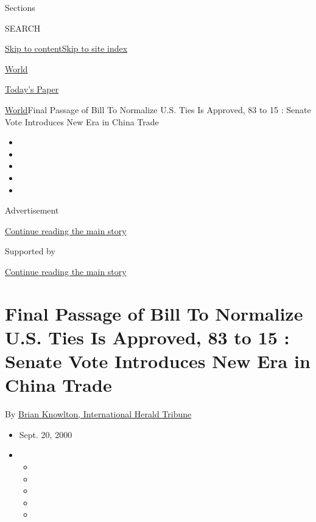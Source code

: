 Sections

SEARCH

\protect\hyperlink{site-content}{Skip to
content}\protect\hyperlink{site-index}{Skip to site index}

\href{https://www.nytimes3xbfgragh.onion/section/world}{World}

\href{https://myaccount.nytimes3xbfgragh.onion/auth/login?response_type=cookie\&client_id=vi}{}

\href{https://www.nytimes3xbfgragh.onion/section/todayspaper}{Today's
Paper}

\href{/section/world}{World}\textbar{}Final Passage of Bill To Normalize
U.S. Ties Is Approved, 83 to 15 : Senate Vote Introduces New Era in
China Trade

\begin{itemize}
\item
\item
\item
\item
\item
\end{itemize}

Advertisement

\protect\hyperlink{after-top}{Continue reading the main story}

Supported by

\protect\hyperlink{after-sponsor}{Continue reading the main story}

\hypertarget{final-passage-of-bill-to-normalize-us-ties-is-approved-83-to-15--senate-vote-introduces-new-era-in-china-trade}{%
\section{Final Passage of Bill To Normalize U.S. Ties Is Approved, 83 to
15 : Senate Vote Introduces New Era in China
Trade}\label{final-passage-of-bill-to-normalize-us-ties-is-approved-83-to-15--senate-vote-introduces-new-era-in-china-trade}}

By \href{https://www.nytimes3xbfgragh.onion/by/brian-knowlton}{Brian
Knowlton, International Herald Tribune}

\begin{itemize}
\item
  Sept. 20, 2000
\item
  \begin{itemize}
  \item
  \item
  \item
  \item
  \item
  \end{itemize}
\end{itemize}

